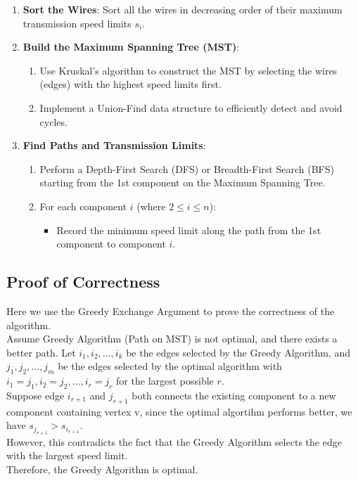 \begin{solution}
\begin{enumerate}
    \item \textbf{Sort the Wires}: Sort all the wires in decreasing order of their maximum transmission speed limits $s_i$.
    \item \textbf{Build the Maximum Spanning Tree (MST)}:
    \begin{enumerate}
        \item Use Kruskal's algorithm to construct the MST by selecting the wires (edges) with the highest speed limits first.
        \item Implement a Union-Find data structure to efficiently detect and avoid cycles.
    \end{enumerate}
    \item \textbf{Find Paths and Transmission Limits}:
    \begin{enumerate}
        \item Perform a Depth-First Search (DFS) or Breadth-First Search (BFS) starting from the 1st component on the Maximum Spanning Tree.
        \item For each component $i$ (where $2 \leq i \leq n$):
        \begin{itemize}
            \item Record the minimum speed limit along the path from the 1st component to component $i$.
        \end{itemize}
    \end{enumerate}
\end{enumerate}
\subsection*{Proof of Correctness}
Here we use the Greedy Exchange Argument to prove the correctness of the algorithm.\\
Assume Greedy Algorithm (Path on MST) is not optimal, and there exists a better path. Let $i_1, i_2, \ldots, i_k$ be the edges selected by the Greedy Algorithm, and $j_1, j_2, \ldots, j_m$ be the edges selected by the optimal algorithm with $i_1 = j_1, i_2 = j_2, \ldots, i_r = j_r$ for the largest possible $r$.\\
Suppose edge $i_{r+1}$ and $j_{r+1}$ both connects the existing component to a new component containing vertex v, since the optimal algortihm performs better, we have $s_{j_{r+1}} > s_{i_{r+1}}$.\\
However, this contradicts the fact that the Greedy Algorithm selects the edge with the largest speed limit.\\
Therefore, the Greedy Algorithm is optimal.

\end{solution}
